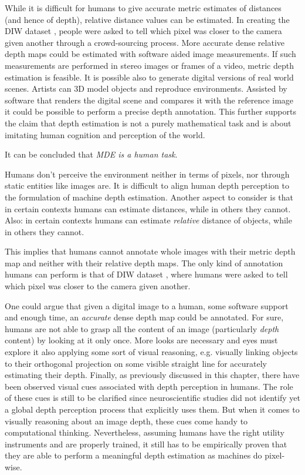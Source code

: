 \vspace{1cm}

While it is difficult for humans to give accurate metric estimates of distances (and hence of depth), relative distance values can be estimated.
In creating the DIW dataset \cite{DIW}, people were asked to tell which pixel was closer to the camera given another through a crowd-sourcing process.
More accurate dense relative depth maps could be estimated with software aided image measurements.
If such measurements are performed in stereo images or frames of a video, metric depth estimation is feasible.
It is possible also to generate digital versions of real world scenes.
Artists can 3D model objects and reproduce environments.
Assisted by software that renders the digital scene and compares it with the reference image it could be possible to perform a precise depth annotation.
This further supports the claim that depth estimation is not a purely mathematical task and is about imitating human cognition and perception of the world.

\vspace{1cm}

It can be concluded that \textit{MDE is a human task}.

\vspace{1cm}

Humans don't perceive the environment neither in terms of pixels, nor through static entities like images are.
It is difficult to align human depth perception to the formulation of machine depth estimation.
Another aspect to consider is that in certain contexts humans can estimate distances, while in others they cannot.
Also: in certain contexts humans can estimate \textit{relative} distance of objects, while in others they cannot.

This implies that humans cannot annotate whole images with their metric depth map and neither with their relative depth maps.
The only kind of annotation humans can perform is that of DIW dataset \cite{DIW}, where humans were asked to tell which pixel was closer to the camera given another.

One could argue that given a digital image to a human, some software support and enough time, an \textit{accurate} dense depth map could be annotated.
For sure, humans are not able to grasp all the content of an image (particularly \textit{depth} content) by looking at it only once.
More looks are necessary and eyes must explore it also applying some sort of visual reasoning, e.g. visually linking objects to their orthogonal projection on some visible straight line for accurately estimating their depth.
Finally, as previously discussed in this chapter, there have been observed visual cues associated with depth perception in humans.
The role of these cues is still to be clarified since neuroscientific studies did not identify yet a global depth perception process that explicitly uses them.
But when it comes to visually reasoning about an image depth, these cues come handy to computational thinking. 
Nevertheless, assuming humans have the right utility instruments and are properly trained, it still has to be empirically proven that they are able to perform a meaningful depth estimation as machines do pixel-wise.

